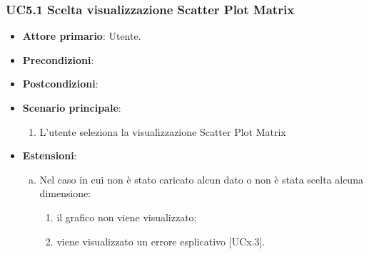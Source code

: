 \subsubsection{UC5.1 Scelta visualizzazione Scatter Plot Matrix}
\begin{figure}[h]
\centering
\caption{}
\end{figure}
\begin{itemize}
	\item \textbf{Attore primario}: Utente.
	\item \textbf{Precondizioni}:
	\item \textbf{Postcondizioni}:
	\item \textbf{Scenario principale}:
		\begin{enumerate}
			\item L'utente seleziona la visualizzazione Scatter Plot Matrix
		\end{enumerate}
	\item \textbf{Estensioni}:
	\begin{enumerate}[(a)]
		\item Nel caso in cui non è stato caricato alcun dato o non è stata scelta alcuna dimensione:
		\begin{enumerate}[1.]
			\item il grafico non viene visualizzato;
			\item viene visualizzato un errore esplicativo [UCx.3].
		\end{enumerate}
	\end{enumerate}
\end{itemize}